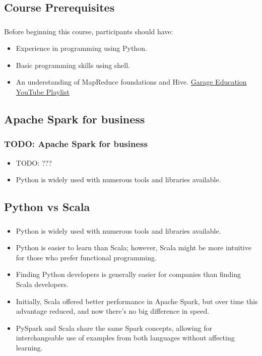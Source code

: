 \subsection{Course Prerequisites}
\begin{frame}
    \frametitle{\subsecname}
    Before beginning this course, participants should have:
    \begin{itemize}
        \item Experience in programming using Python.  
        \item Basic programming skills using shell.  
        \item An understanding of MapReduce foundations and Hive. \href{https://www.youtube.com/playlist?list=PLxNoJq6k39G8Ak39PDC-oYvp6ZRvIn3Pa}{Garage Education YouTube Playlist}  
    \end{itemize}

\end{frame}


\subsection{Apache Spark for business}\label{subsec:spark-for-non-technical}
\begin{frame}
    \frametitle{TODO: Apache Spark for business}
    \begin{itemize}
        \item TODO: ???
        \item Python is widely used with numerous tools and libraries available. 
    \end{itemize}
\end{frame}

\subsection{Python vs Scala}\label{subsec:python-vs-scala}
\begin{frame}
    \frametitle{\subsecname}
    \begin{itemize}
        \item Python is widely used with numerous tools and libraries available. 
        \item Python is easier to learn than Scala; however, Scala might be more intuitive for those who prefer functional programming. 
        \item Finding Python developers is generally easier for companies than finding Scala developers. 
        \item Initially, Scala offered better performance in Apache Spark, but over time this advantage reduced, and now there's no big difference in speed. 
        \item PySpark and Scala share the same Spark concepts, allowing for interchangeable use of examples from both languages without affecting learning. 
    \end{itemize}
\end{frame}

